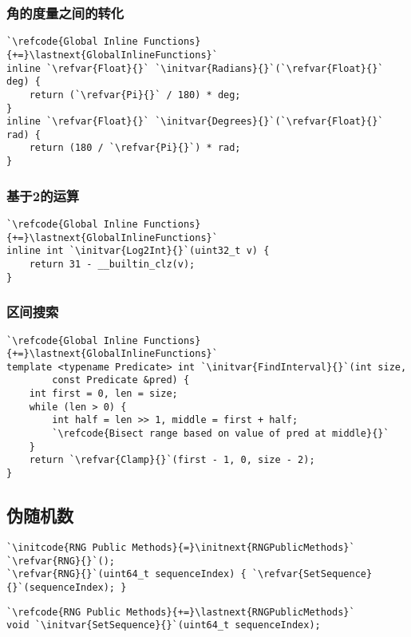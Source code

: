 \subsubsection*{角的度量之间的转化}
\begin{lstlisting}
`\refcode{Global Inline Functions}{+=}\lastnext{GlobalInlineFunctions}`
inline `\refvar{Float}{}` `\initvar{Radians}{}`(`\refvar{Float}{}` deg) { 
    return (`\refvar{Pi}{}` / 180) * deg; 
}
inline `\refvar{Float}{}` `\initvar{Degrees}{}`(`\refvar{Float}{}` rad) { 
    return (180 / `\refvar{Pi}{}`) * rad; 
}
\end{lstlisting}

\subsubsection*{基于2的运算}
\begin{lstlisting}
`\refcode{Global Inline Functions}{+=}\lastnext{GlobalInlineFunctions}`
inline int `\initvar{Log2Int}{}`(uint32_t v) {
    return 31 - __builtin_clz(v);
}
\end{lstlisting}

\subsubsection*{区间搜索}
\begin{lstlisting}
`\refcode{Global Inline Functions}{+=}\lastnext{GlobalInlineFunctions}`
template <typename Predicate> int `\initvar{FindInterval}{}`(int size,
        const Predicate &pred) {
    int first = 0, len = size;
    while (len > 0) {
        int half = len >> 1, middle = first + half;
        `\refcode{Bisect range based on value of pred at middle}{}`
    }
    return `\refvar{Clamp}{}`(first - 1, 0, size - 2);
}
\end{lstlisting}

\subsection{伪随机数}\label{sub:伪随机数}
{}
\begin{lstlisting}
`\initcode{RNG Public Methods}{=}\initnext{RNGPublicMethods}`
`\refvar{RNG}{}`();
`\refvar{RNG}{}`(uint64_t sequenceIndex) { `\refvar{SetSequence}{}`(sequenceIndex); }
\end{lstlisting}

\begin{lstlisting}
`\refcode{RNG Public Methods}{+=}\lastnext{RNGPublicMethods}`
void `\initvar{SetSequence}{}`(uint64_t sequenceIndex);
\end{lstlisting}

